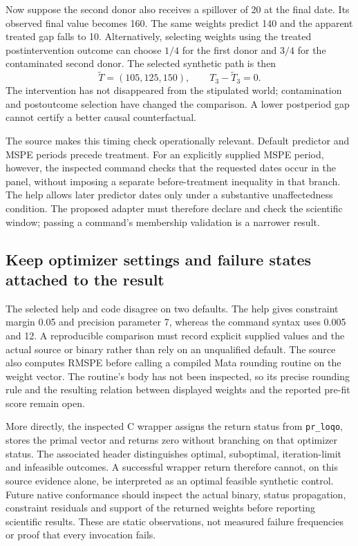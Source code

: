 Now suppose the second donor also receives a spillover of 20 at the final date.
Its observed final value becomes 160. The same weights predict 140 and the
apparent treated gap falls to 10. Alternatively, selecting weights using the
treated postintervention outcome can choose $1/4$ for the first donor and $3/4$
for the contaminated second donor. The selected synthetic path is then
\begin{equation}
 \widetilde T=(105,125,150),\qquad T_3-\widetilde T_3=0.
 \label{exec19:synth-leakage}
\end{equation}
The intervention has not disappeared from the stipulated world; contamination
and postoutcome selection have changed the comparison. A lower postperiod gap
cannot certify a better causal counterfactual.\citep{exec19_synth_contract_reference}

The source makes this timing check operationally relevant. Default predictor
and MSPE periods precede treatment. For an explicitly supplied MSPE period,
however, the inspected command checks that the requested dates occur in the
panel, without imposing a separate before-treatment inequality in that branch.
The help allows later predictor dates only under a substantive unaffectedness
condition. The proposed adapter must therefore declare and check the scientific
window; passing a command's membership validation is a narrower result.
\citep{exec19_synth_stata_source}

\subsection{Keep optimizer settings and failure states attached to the result}
\label{exec19:synth-numerics}

The selected help and code disagree on two defaults. The help gives constraint
margin 0.05 and precision parameter 7, whereas the command syntax uses 0.005 and
12. A reproducible comparison must record explicit supplied values and the
actual source or binary rather than rely on an unqualified default. The source
also computes RMSPE before calling a compiled Mata rounding routine on the
weight vector. The routine's body has not been inspected, so its precise
rounding rule and the resulting relation between displayed weights and the
reported pre-fit score remain open.\citep{exec19_synth_stata_source}

More directly, the inspected C wrapper assigns the return status from
\texttt{pr\_loqo}, stores the primal vector and returns zero without branching
on that optimizer status. The associated header distinguishes optimal,
suboptimal, iteration-limit and infeasible outcomes. A successful wrapper return
therefore cannot, on this source evidence alone, be interpreted as an optimal
feasible synthetic control. Future native conformance should inspect the actual
binary, status propagation, constraint residuals and support of the returned
weights before reporting scientific results. These are static observations,
not measured failure frequencies or proof that every invocation fails.
\citep{exec19_synth_stata_source}

